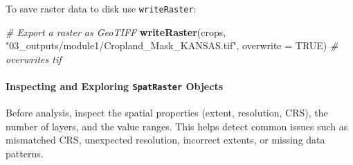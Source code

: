 \documentclass[
  10pt,
  b5paper,
  oneside]{book}
\newenvironment{Shaded}{\begin{snugshade}}{\end{snugshade}}
\newcommand{\AttributeTok}[1]{\textcolor[rgb]{0.13,0.29,0.53}{#1}}
\newcommand{\CommentTok}[1]{\textcolor[rgb]{0.56,0.35,0.01}{\textit{#1}}}
\newcommand{\ConstantTok}[1]{\textcolor[rgb]{0.56,0.35,0.01}{#1}}
\newcommand{\FunctionTok}[1]{\textcolor[rgb]{0.13,0.29,0.53}{\textbf{#1}}}
\newcommand{\NormalTok}[1]{#1}
\newcommand{\StringTok}[1]{\textcolor[rgb]{0.31,0.60,0.02}{#1}}
\begin{document}
To save raster data to disk use \texttt{writeRaster}:

\begin{Shaded}
\begin{Highlighting}[]
\CommentTok{\# Export a raster as GeoTIFF}
\FunctionTok{writeRaster}\NormalTok{(crops, }\StringTok{"03\_outputs/module1/Cropland\_Mask\_KANSAS.tif"}\NormalTok{, }\AttributeTok{overwrite =} \ConstantTok{TRUE}\NormalTok{) }\CommentTok{\# overwrites tif}
\end{Highlighting}
\end{Shaded}

\paragraph*{\texorpdfstring{Inspecting and Exploring \texttt{SpatRaster} Objects}{Inspecting and Exploring SpatRaster Objects}}\label{inspecting-and-exploring-spatraster-objects}

Before analysis, inspect the spatial properties (extent, resolution, CRS), the number of layers, and the value ranges. This helps detect common issues such as mismatched CRS, unexpected resolution, incorrect extents, or missing data patterns.
\end{document}

